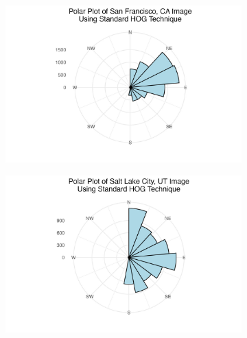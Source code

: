 \documentclass[
  letterpaper,
  DIV=11,
  numbers=noendperiod]{scrreprt}
\begin{document}
\begin{figure}

\begin{minipage}{0.33\linewidth}

\begin{figure}[H]

{\centering \includegraphics{images/plots/aerial_cities/sf_standard_polar_plot.jpg}

}


\end{figure}%

\end{minipage}%
%
\begin{minipage}{0.33\linewidth}

\begin{figure}[H]

{\centering \includegraphics{images/plots/aerial_cities/salt_lake_standard_polar_plot.jpg}

}
\end{figure}
\end{minipage}
\end{figure}
\end{document}
